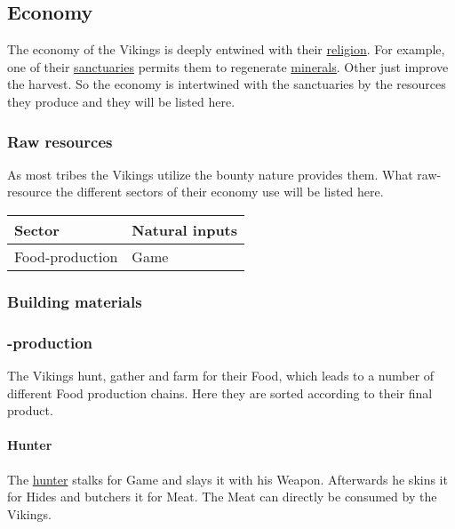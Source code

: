 \subsection{Economy}\label{ch:Tribes:Vikings:Economy}
The economy of the \gls*{Vikings} is deeply entwined with their
\hyperref[ch:Tribes:Vikings:Religion]{religion}. For example, one of their
\hyperref[ch:Tribes:Vikings:Religion:Mountain]{sanctuaries} permits them to
regenerate \hyperref[ch:Goods:Nature:Minerals]{minerals}. Other just improve
the harvest. So the economy is intertwined with the sanctuaries by the
resources they produce and they will be listed here.

\subsubsection{Raw resources}\label{ch:Tribes:Vikings:Economy:RawInputs}
As most tribes the \gls*{Vikings} utilize the bounty nature provides them. What
raw-resource the different sectors of their economy use will be listed here.

\begin{longtable}{ll}
	\toprule
	Sector                & Natural inputs \\
	\midrule
	\Gls{Food}-production & \Gls{Game}     \\
	\bottomrule
\end{longtable}

\subsubsection{Building materials}\label{ch:Tribes:Vikings:Economy:Building}


\subsubsection{-production}\label{ch:Tribes:Vikings:Economy:Food}
The \gls*{Vikings} hunt, gather and farm for their \gls{Food}, which leads to a
number of different \gls{Food} production chains. Here they are sorted
according to their final product.

\paragraph{Hunter}
The \hyperref[ch:Tribes:Vikings:Professions]{hunter} stalks for \gls{Game} and
slays it with his \gls{Weapon}. Afterwards he skins it for \glspl{Hide} and
butchers it for \gls{Meat}. The \gls{Meat} can directly be consumed by the
\gls{Vikings}.

